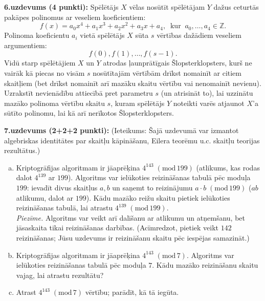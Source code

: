 \documentclass[11pt]{article}
\begin{document}
\vspace{6pt}
{\bf 6.uzdevums (4 punkti):}
Spēlētājs $X$ vēlas nosūtīt spēlētājam $Y$ dažus ceturtās pakāpes polinomus ar veseliem koeficientiem: 
$$f(x) = a_0x^4 + a_1x^3 + a_2x^2 + a_3x + a_4,\;\;\text{kur}\;\;a_0,\ldots,a_4 \in \mathbb{Z}.$$
Polinoma koeficientu $a_i$ vietā spēlētājs $X$ sūta $s$ vērtības dažādiem veseliem argumentiem: 
$$f(0),f(1),\ldots,f(s-1).$$
Vidū starp spēlētājiem $X$ un $Y$ atrodas ļaunprātīgais Šlopsterklopsters, kurš ne vairāk kā piecas
no visām $s$ nosūtītajām vērtībām drīkst nomainīt ar citiem skaitļiem (bet drīkst nomainīt arī mazāku skaitu 
vērtību vai nenomainīt nevienu).\\
Uzrakstīt nevienādību attiecībā pret parametru $s$ (un atrisināt to), lai uzzinātu mazāko polinoma vērtību skaitu $s$, kuram
spēlētājs $Y$ noteikti varēs atjaunot $X$'a sūtīto polinomu, lai kā arī nerīkotos Šlopsterklopsters.



\vspace{6pt}
{\bf 7.uzdevums (2+2+2 punkti):} 
(Ieteikums: Šajā uzdevumā var izmantot algebriskas identitātes par skaitļu kāpināšanu, Eilera teorēmu u.c. skaitļu teorijas rezultātus.)
\begin{enumerate}[(a)]
\item Kriptogrāfijas algoritmam ir jāaprēķina $4^{143}\;(\text{mod}\,199)$ (atlikums, kas rodas dalot $4^{139}$ ar $199$). 
Algoritms var ielūkoties reizināšanas tabulā pēc moduļa $199$: ievadīt divus skaitļus $a,b$ un saņemt to reizinājumu 
$a\cdot{}b\;(\text{mod}\,199)$ ($ab$ atlikumu, dalot ar $199$).
Kādu mazāko reižu skaitu pietiek ielūkoties reizināšanas tabulā, lai atrastu $4^{139}\;(\text{mod}\,199)$.\\
{\em Piezīme.} Algoritms var veikt arī dalīšanu ar atlikumu un atņemšanu, bet jāsaskaita tikai reizināšanas darbības.
(Acīmredzot, pietiek veikt $142$ reizināšanas; Jūsu uzdevums ir reizināšanu skaitu pēc iespējas samazināt.)
\item Kriptogrāfijas algoritmam ir jāaprēķina $4^{143}\;(\text{mod}\,7)$. Algoritms var ielūkoties reizināšanas tabulā 
pēc moduļa $7$. Kādu mazāko reizināšanu skaitu vajag, lai atrastu rezultātu? 
\item Atrast $4^{143}\;(\text{mod}\,7)$ vērtību; parādīt, kā tā iegūta.
\end{enumerate}
\end{document}
